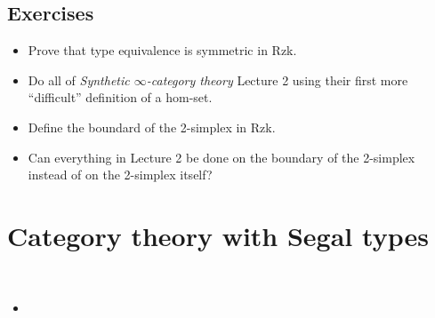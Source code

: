 \documentclass[10pt]{article}
\begin{document}
\subsection*{Exercises}
\begin{itemize}
\item Prove that type equivalence is symmetric in Rzk.
\item Do all of \textit{Synthetic $\infty$-category theory} Lecture 2 \cite{weinberger-2026} using their first more \enquote{difficult} definition of a hom-set.
\item Define the boundard of the 2-simplex in Rzk.
\item Can everything in Lecture 2 \cite{weinberger-2026} be done on the boundary of the 2-simplex instead of on the 2-simplex itself?
\end{itemize}

\section{Category theory with Segal types} \\

\begin{itemize}
\item

\end{itemize}



\nocite{*}


\end{document}
